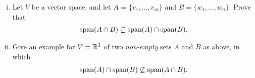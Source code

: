 \begin{question}\label{que:SpanIntersection}
    \normalfont

    \begin{enumerate}[(i)]
        \item Let $V$ be a vector space, and let $A$ = $\{v_1,\dots, v_m\}$ and $B=\{ w_1, \dots, w_n\}$.  Prove that
              \begin{align*}
                  \textnormal{span}(A\cap B) \subseteq \textnormal{span}(A)\cap\textnormal{span}(B).
              \end{align*}


        \item Give an example for $V={\mathbb R}^3$ of two \emph{non-empty} sets $A$ and $B$ as above, in which
              \begin{align*}
                  \textnormal{span}(A)\cap \textnormal{span}(B) \not\subseteq \textnormal{span}(A\cap B).
              \end{align*}


    \end{enumerate}
\end{question}
